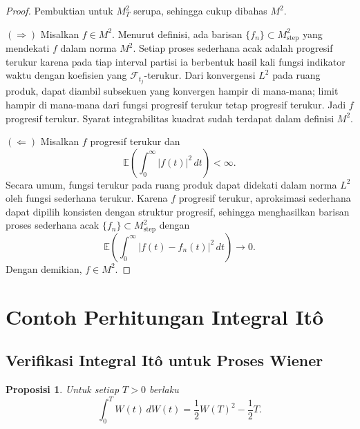 \documentclass[12pt,a4paper]{article}
\theoremstyle{definition}
\theoremstyle{plain}
\newtheorem{proposisi}[definisi]{Proposisi}
\newcommand{\E}{\mathbb{E}}
\newcommand{\F}{\mathcal{F}}
\begin{document}
\begin{proof}
  Pembuktian untuk $M_T^2$ serupa, sehingga cukup dibahas $M^2$.

  $(\Rightarrow)$ Misalkan $f\in M^2$. Menurut definisi, ada barisan
  $\{f_n\}\subset M_{\mathrm{step}}^2$ yang mendekati $f$ dalam norma $M^2$.
  Setiap proses sederhana acak adalah progresif terukur karena pada tiap
  interval partisi ia berbentuk hasil kali fungsi indikator waktu dengan
  koefisien yang $\F_{t_j}$-terukur. Dari konvergensi $L^2$ pada ruang produk,
  dapat diambil subsekuen yang konvergen hampir di mana-mana; limit hampir di
  mana-mana dari fungsi progresif terukur tetap progresif terukur. Jadi $f$
  progresif terukur. Syarat integrabilitas kuadrat sudah terdapat dalam definisi
  $M^2$.

  $(\Leftarrow)$ Misalkan $f$ progresif terukur dan
  \[
    \E\left(\int_0^\infty |f(t)|^2\,dt\right)<\infty.
  \]
  Secara umum, fungsi terukur pada ruang produk dapat didekati dalam norma
  $L^2$ oleh fungsi sederhana terukur. Karena $f$ progresif terukur, aproksimasi
  sederhana dapat dipilih konsisten dengan struktur progresif, sehingga
  menghasilkan barisan proses sederhana acak $\{f_n\}\subset M_{\mathrm{step}}^2$
  dengan
  \[
    \E\left(\int_0^\infty |f(t)-f_n(t)|^2\,dt\right)\to 0.
  \]
  Dengan demikian, $f\in M^2$.
\end{proof}

\section{Contoh Perhitungan Integral It\^o}

\subsection{Verifikasi Integral It\^o untuk Proses Wiener}

\begin{proposisi}
  Untuk setiap $T>0$ berlaku
  \[
    \int_0^T W(t)\,dW(t)
    =
    \frac12 W(T)^2-\frac12 T.
  \]
\end{proposisi}
\end{document}
